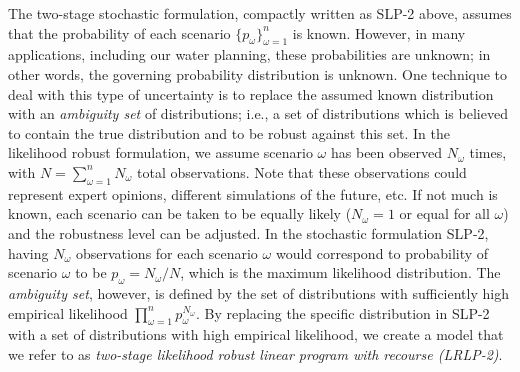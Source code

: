 \documentclass[12pt]{amsart}
\begin{document}
The two-stage stochastic formulation, compactly written as SLP-2 above, assumes that the probability of each scenario $\{p_\omega\}_{\omega=1}^{n}$ is known.
However, in many applications, including our water planning, these probabilities are unknown; in other words, the governing probability distribution is unknown.
One technique to deal with this type of uncertainty is to replace the assumed known distribution with an {\it ambiguity set} of distributions; i.e., a set of distributions which is believed to contain the true distribution and to be robust against this set.
In the likelihood robust formulation, we assume scenario $\omega$ has been observed $N_\omega$ times, with $N = \sum_{\omega=1}^n N_\omega$ total observations. 
Note that these observations could represent expert opinions, different simulations of the future, etc. 
If not much is known, each scenario can be taken to be equally likely ($N_\omega = 1$ or equal for all $\omega$) and the robustness level can be adjusted. 
In the stochastic formulation SLP-2, having  $N_\omega$ observations for each scenario $\omega$ would correspond to probability of scenario $\omega$ to be $p_\omega = N_\omega / N$, which is the maximum likelihood distribution. 
The {\it ambiguity set}, however, is defined by the set of distributions with sufficiently high empirical likelihood $\prod_{\omega=1}^n p_\omega^{N_\omega}$. 
By replacing the specific distribution in SLP-2 with a set of distributions with  high empirical likelihood, we create a model that we refer to as {\it two-stage likelihood robust linear program with recourse (LRLP-2)}.
\end{document}
